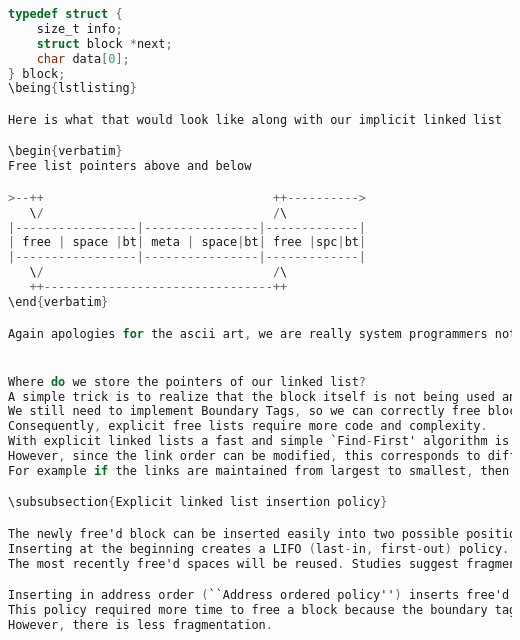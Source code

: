 \begin{lstlisting}[language=C]
typedef struct {
    size_t info;
    struct block *next;
    char data[0];
} block;
\being{lstlisting}

Here is what that would look like along with our implicit linked list

\begin{verbatim}
Free list pointers above and below

>--++                                ++---------->
   \/                                /\
|-----------------|----------------|-------------|
| free | space |bt| meta | space|bt| free |spc|bt|
|-----------------|----------------|-------------|
   \/                                /\
   ++--------------------------------++
\end{verbatim}

Again apologies for the ascii art, we are really system programmers not computer graphics people.


Where do we store the pointers of our linked list?
A simple trick is to realize that the block itself is not being used and store the next and previous pointers as part of the block, though now you have to ensure that the free blocks are always sufficiently large to hold two pointers.
We still need to implement Boundary Tags, so we can correctly free blocks and coalesce them with their two neighbors.
Consequently, explicit free lists require more code and complexity.
With explicit linked lists a fast and simple `Find-First' algorithm is used to find the first sufficiently large link.
However, since the link order can be modified, this corresponds to different placement strategies.
For example if the links are maintained from largest to smallest, then this produces a `Worst-Fit' placement strategy.

\subsubsection{Explicit linked list insertion policy}

The newly free'd block can be inserted easily into two possible positions: at the beginning or in address order.
Inserting at the beginning creates a LIFO (last-in, first-out) policy.
The most recently free'd spaces will be reused. Studies suggest fragmentation is worse than using address order \cite{10.1007/3-540-60368-9_19}.

Inserting in address order (``Address ordered policy'') inserts free'd blocks so that the blocks are visited in increasing address order.
This policy required more time to free a block because the boundary tags (size data) must be used to find the next and previous unallocated blocks.
However, there is less fragmentation.


\end{lstlisting}
